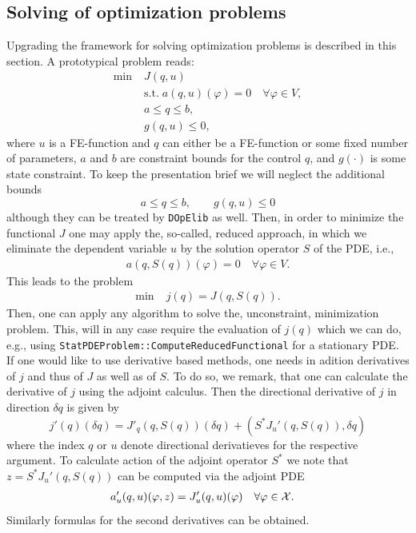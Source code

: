 \documentclass[prodmode,acmtoms]{acmsmall}
\numberwithin{equation}{section}
\renewcommand{\phi}{\varphi}
\newcommand{\dope}{\texttt{DOpElib}}
\begin{document}
\subsection{Solving of optimization problems}\label{sec:opt}
Upgrading the framework for solving optimization problems
is described in this section. A prototypical problem reads:
\begin{align*}
\min\;&J(q,u) \\
  &\text{s.t.}\; a(q,u)(\phi) = 0 \quad \forall \phi\in V,\\
  &a \le q \le b,\\
  &g(q,u) \le 0,  
\end{align*}
where $u$ is a FE-function and $q$ can either be a FE-function or some 
fixed number of parameters, $a$ and $b$ are constraint bounds for the control $q$,
and $g(\cdot)$ is some state constraint.
To keep the presentation brief we will neglect the additional bounds
\[
a \le q \le b,\qquad g(q,u) \le 0
\]
although they can be treated by \dope{} as well.
Then, in order to minimize the functional $J$ one may apply the, so-called, 
reduced approach, in which we eliminate the dependent variable $u$ by the solution 
operator $S$ of the PDE, i.e., 
\begin{align*}
a(q,S(q))(\phi) = 0 \quad \forall \phi\in V. 
\end{align*}
This leads to the problem
\begin{align*}
\min\;&j(q) = J(q,S(q)). 
\end{align*}
Then, one can apply any algorithm to solve the, unconstraint, minimization 
problem. This, will in any case require the evaluation of $j(q)$ which 
we can do, e.g., using \texttt{StatPDEProblem::ComputeReducedFunctional} for 
a stationary PDE. If one would like to use derivative based methods, one 
needs in adition derivatives of $j$ and thus of $J$ as well as of $S$. 
To do so, we remark, that one can calculate the derivative of 
$j$ using the adjoint calculus. Then the directional derivative 
of $j$ in direction $\delta q$ is given by
\[
j'(q)(\delta q) = J'_q(q,S(q))(\delta q) + (S^* J_u'(q,S(q)),\delta q)
\]
where the index $q$ or $u$ denote directional derivatieves for the 
respective argument. To calculate action of the adjoint operator $S^*$ 
we note that $z =  S^* J_u'(q,S(q))$
can be computed via the adjoint PDE
\begin{equation}
  \label{opt_KKT_system}
  \begin{aligned}
    a_{u}'(q,u)(\phi , z) &= J'_{u}(q,u)(\phi) & \forall \phi&\in {\cal X}.
  \end{aligned}
\end{equation}
Similarly formulas for the second derivatives can be obtained.
\end{document}
